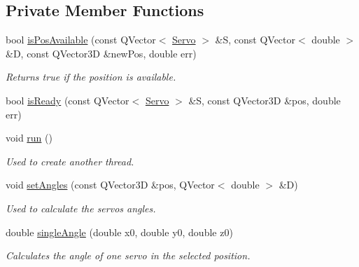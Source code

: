 \subsection*{Private Member Functions}
\begin{DoxyCompactItemize}
\item 
bool \hyperlink{a00009_a85e5ae874d5e877b94a4a1cc78fe9598}{is\+Pos\+Available} (const Q\+Vector$<$ \hyperlink{a00007}{Servo} $>$ \&S, const Q\+Vector$<$ double $>$ \&D, const Q\+Vector3\+D \&new\+Pos, double err)
\begin{DoxyCompactList}\small\item\em Returns true if the position is available. \end{DoxyCompactList}\item 
bool \hyperlink{a00009_a7a58c195c66f7d668b9344b82c7ac631}{is\+Ready} (const Q\+Vector$<$ \hyperlink{a00007}{Servo} $>$ \&S, const Q\+Vector3\+D \&pos, double err)
\item 
void \hyperlink{a00009_aeeb31b85abf7eb5c701853a6d25e51e0}{run} ()
\begin{DoxyCompactList}\small\item\em Used to create another thread. \end{DoxyCompactList}\item 
void \hyperlink{a00009_a2b9f97473d19a7defaed3451bc830f79}{set\+Angles} (const Q\+Vector3\+D \&pos, Q\+Vector$<$ double $>$ \&D)
\begin{DoxyCompactList}\small\item\em Used to calculate the servos angles. \end{DoxyCompactList}\item 
double \hyperlink{a00009_add4637d917a772c4c01a43b5b66da2be}{single\+Angle} (double x0, double y0, double z0)
\begin{DoxyCompactList}\small\item\em Calculates the angle of one servo in the selected position. \end{DoxyCompactList}\end{DoxyCompactItemize}
